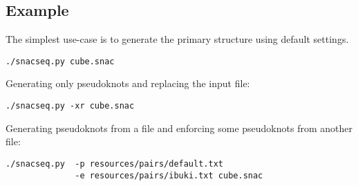 \subsection{Example}
The simplest use-case is to generate the primary structure using default settings.
\begin{verbatim}
./snacseq.py cube.snac
\end{verbatim}
Generating only pseudoknots and replacing the input file:
\begin{verbatim}
./snacseq.py -xr cube.snac
\end{verbatim}
Generating pseudoknots from a file and enforcing some pseudoknots from another file:
\begin{verbatim}
./snacseq.py  -p resources/pairs/default.txt
              -e resources/pairs/ibuki.txt cube.snac
\end{verbatim}
